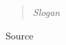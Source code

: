 \thispagestyle{empty}
\vspace*{\fill}
\begin{center}
    \begin{quote}
        \textit{Slogan}
    \end{quote}
    \begin{flushright}
        \begin{small}
            Source
        \end{small}
    \end{flushright}
\end{center}
\vfill
